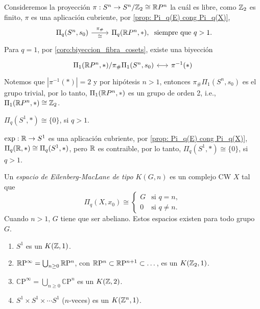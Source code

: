 \begin{dem}
    Consideremos la proyección $\pi:S^n\to S^n/\mathbb{Z}_2\cong \mathbb{R} P^n$ la cuál es libre, como $\mathbb{Z}_2$ es finito, $\pi$ es una aplicación cubriente, por \ref{prop: Pi_q(E) cong Pi_q(X)}, 
    \begin{equation*}
        \begin{tikzcd}
            \Pi_q(S^n,s_0)\arrow[r,"\pi_\#","\cong"'] & \Pi_q(\R P^n,*),
        \end{tikzcd} \text{ siempre que } q>1.
    \end{equation*}
    Para $q=1$, por \ref{coro:biyeccion_fibra_cosets}, existe una biyección 
    \begin{equation*}
        \begin{tikzcd}[column sep=0.55cm]
            \Pi_1(\R P^n,*)/\pi_\#\Pi_1(S^n,s_0)\arrow[r,<->] & \pi^{-1}(*)
        \end{tikzcd}
    \end{equation*}
    Notemos que $|\pi^{-1}(*)|=2$ y por hipótesis $n>1$, entonces $\pi_\#\Pi_1(S^n,s_0)$ es el grupo trivial, por lo tanto, $\Pi_1(\mathbb{R} P^n,*)$ es un grupo de orden 2, i.e., $\Pi_1(\mathbb{R} P^n,*)\cong \mathbb{Z}_2$.
\end{dem}
\begin{prop}
    $\Pi_q(S^1,*)\cong\{0\}$, si $q>1.$
\end{prop}
\begin{dem}
    $\exp:\mathbb{R}\to S^1$ es una aplicación cubriente, por \ref{prop: Pi_q(E) cong Pi_q(X)}, $\Pi_q(\mathbb{R},*)\cong\Pi_q(S^1,*)$, pero $\mathbb{R}$ es contraible, por lo tanto, $\Pi_q(S^1,*)\cong\{0\}$, si $q>1.$
\end{dem}
\begin{definicion}
Un \textit{espacio de Eilenberg-MacLane de tipo $K(G, n)$} es un complejo CW $X$ tal que
\[
\Pi_q(X, x_0) \cong 
\begin{cases} 
G & \text{si } q = n, \\ 
0 & \text{si } q \neq n.
\end{cases}
\]
Cuando $n > 1$, $G$ tiene que ser abeliano. Estos espacios existen para todo grupo $G$.
\end{definicion}

\begin{ejemplo}
\begin{enumerate}
    \item[(1)] $S^1$ es un $K(\mathbb{Z}, 1)$.
    \item[(2)] $\mathbb{R}\mathrm{P}^\infty = \bigcup_{n \geq 0} \mathbb{R}\mathrm{P}^n$, con $\mathbb{R}\mathrm{P}^n \subset \mathbb{R}\mathrm{P}^{n+1} \subset \dots$, es un $K(\mathbb{Z}_2, 1)$.
    \item[(3)] $\mathbb{C}\mathrm{P}^\infty = \bigcup_{n \geq 0} \mathbb{C}\mathrm{P}^n$ es un $K(\mathbb{Z}, 2)$.
    \item[(4)] $S^1 \times S^1\times\cdots S^1$ ($n$-veces) es un $K(\mathbb{Z}^n, 1)$.
\end{enumerate}
\end{ejemplo}

